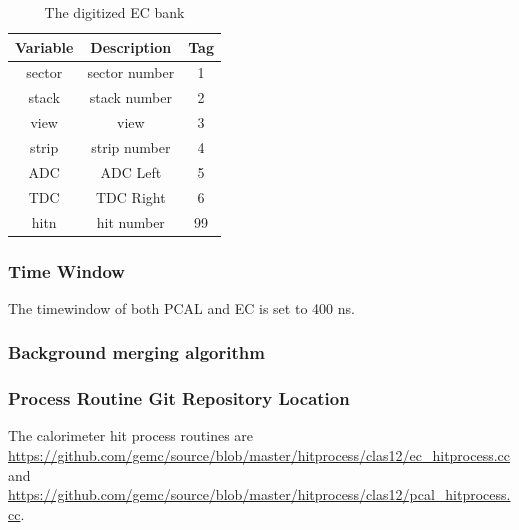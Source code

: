 \begin{table}[h]
	\begin{center}
		\begin{tabular}{| c | c | c |}
			\hline \hline
			Variable         & Description  & Tag  \\
			\hline
             sector  &                                     sector number  &    1 \\
              stack  &                                      stack number  &    2 \\
               view  &                                              view  &    3 \\
              strip  &                                      strip number  &    4 \\
                ADC  &                                          ADC Left  &    5 \\
                TDC  &                                         TDC Right  &    6 \\
               hitn  &                                        hit number  &   99 \\
			\hline \hline
		\end{tabular}
	\end{center}
	\caption{The digitized EC bank}\label{tab:ecBank}
\end{table}


\subsubsection{Time Window}
The timewindow of both PCAL and EC is set to 400 ns.

\subsubsection{Background merging algorithm}

\subsubsection{Process Routine Git Repository Location}
The calorimeter hit process routines are \url{https://github.com/gemc/source/blob/master/hitprocess/clas12/ec_hitprocess.cc} and
\url{https://github.com/gemc/source/blob/master/hitprocess/clas12/pcal_hitprocess.cc}.

